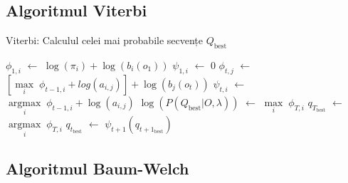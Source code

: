 \documentclass[12pt]{article}
\begin{document}
\subsection{Algoritmul Viterbi}
\label{sec:viterbi}

\begin{algorithm}[H]
  \caption{Viterbi: Calculul celei mai probabile secvențe $Q_{\text{best}}$}
  \label{alg:viterbi}
  \begin{algorithmic}[2]
    \STATE $\phi_{1,i}$ $\leftarrow$ $\log(\pi_{i}) + \log(b_i(o_1))$
    \STATE $\psi_{1,i}$ $\leftarrow$ $0$
    \ENDFOR
    \STATE $\phi_{t,j}$ $\leftarrow$ $[\underset{i}{\operatorname{max}}\; \phi_{t-1,i} +
    log(a_{i,j})] + \log(b_{j}(o_{t}))$
    \STATE $\psi_{t,i}$ $\leftarrow$ $\underset{i}{\operatorname{argmax}}\; \phi_{t-1,i} +
    \log(a_{i,j})$
    \ENDFOR
    \ENDFOR
    \STATE $\log(P(Q_{\text{best}} \vert O, \lambda))$ $\leftarrow$ $\underset{i}{\operatorname{max}}\; \phi_{T,i}$
    \STATE $q_{T_{\text{best}}}$ $\leftarrow$ $\underset{i}{\operatorname{argmax}}\; \phi_{T,i}$
    \STATE $q_{t_{\text{best}}}$ $\leftarrow$ $\psi_{t+1}(q_{t+1_{\text{best}}})$
    \ENDFOR
  \end{algorithmic} 
\end{algorithm}
 
  
\subsection{Algoritmul Baum-Welch}
\label{sec:baum-welch}
\end{document}
